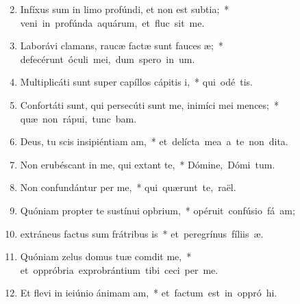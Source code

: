 \begin{flushleft}
\begin{enumerate}[leftmargin=*]
\setcounter{enumi}{1}

\item Infíxus sum in limo profúndi, et non est subtia;~* \mbox{veni in profúnda aquárum, et fluc sit me.}

\item Laborávi clamans, raucæ factæ sunt fauces æ;~* \mbox{defecérunt óculi mei, dum spero in  um.}

\item Multiplicáti sunt super capíllos cápitis i,~* \mbox{qui odé  tis.}

\item Confortáti sunt, qui persecúti sunt me, inimíci mei mences;~* \mbox{quæ non rápui, tunc bam.}

\item Deus, tu scis insipiéntiam am,~* \mbox{et delícta mea a te non  dita.}

\item Non erubéscant in me, qui extant te,~* \mbox{Dómine, Dómi tum.}

\item Non confundántur per me,~* \mbox{qui quærunt te,  raël.}

\item Quóniam propter te sustínui opbrium,~* \mbox{opéruit confúsio fá am;}

\item extráneus factus sum frátribus is~* \mbox{et peregrínus fíliis  æ.}

\item Quóniam zelus domus tuæ comdit me,~* \mbox{et oppróbria exprobrántium tibi ceci per me.}

\item Et flevi in ieiúnio ánimam am,~* \mbox{et factum est in oppró hi.}


\end{enumerate}
\end{flushleft}
